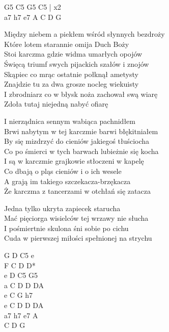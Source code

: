 \begin{text}
    G5 C5 G5 C5 | x2\\
    a7 h7 e7 A C D G

    Między niebem a piekłem wśród słynnych bezdroży\\
    Które lotem starannie omija Duch Boży\\
    Stoi karczma gdzie widma umarłych opojów\\
    Święcą triumf swych pijackich szałów i znojów\\
    Skąpiec co mrąc ostatnie połknął ametysty\\
    Znajdzie tu za dwa grosze nocleg wiekuisty\\
    I zbrodniarz co w błysk noża zachował swą wiarę\\
    Zdoła tutaj niejedną nabyć ofiarę

    I nierządnica sennym wabiąca pachnidłem\\
    Brwi nabytym w tej karczmie barwi błękitniałem\\
    By się mizdrzyć do cieniów jakiegoś tłuściocha\\
    Co po śmierci w tych barwach lubieżnie się kocha\\
    I są w karczmie grajkowie stłoczeni w kapelę\\
    Co dbają o pląs cieniów i o ich wesele\\
    A grają im takiego szczekacza-brzękacza\\
    Że karczma z tancerzami w otchłań się zatacza

    Jedna tylko ukryta zapiecek starucha\\
    Mać pięciorga wisielców tej wrzawy nie słucha\\
    I pośmiertnie skulona śni sobie po cichu\\
    Cuda w pierwszej miłości spełnionej na strychu
\end{text}
\begin{chord}
    \hfill\break
    \hfill\break
    \hfill\break
    G D C5 e\\
    F C D D*\\
    e D C5 G5\\
    a C D D DA\\
    e C G h7\\
    e C D D DA\\
    a7 h7 e7 A\\
    C D G
\end{chord}